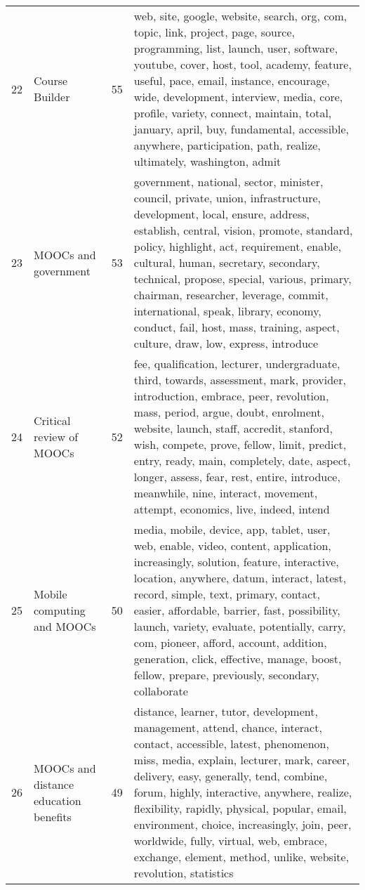 \begin{table}[ht]
{\begin{tabularx}{\textwidth}{llrX}
   22 & Course Builder & 55 & web, site, google, website, search, org, com, topic, link, project, page, source, programming, list, launch, user, software, youtube, cover, host, tool, academy, feature, useful, pace, email, instance, encourage, wide, development, interview, media, core, profile, variety, connect, maintain, total, january, april, buy, fundamental, accessible, anywhere, participation, path, realize, ultimately, washington, admit \\ 
   23 & MOOCs and government & 53 & government, national, sector, minister, council, private, union, infrastructure, development, local, ensure, address, establish, central, vision, promote, standard, policy, highlight, act, requirement, enable, cultural, human, secretary, secondary, technical, propose, special, various, primary, chairman, researcher, leverage, commit, international, speak, library, economy, conduct, fail, host, mass, training, aspect, culture, draw, low, express, introduce \\ 
   24 & Critical review of MOOCs & 52 & fee, qualification, lecturer, undergraduate, third, towards, assessment, mark, provider, introduction, embrace, peer, revolution, mass, period, argue, doubt, enrolment, website, launch, staff, accredit, stanford, wish, compete, prove, fellow, limit, predict, entry, ready, main, completely, date, aspect, longer, assess, fear, rest, entire, introduce, meanwhile, nine, interact, movement, attempt, economics, live, indeed, intend \\ 
   25 & Mobile computing and MOOCs & 50 & media, mobile, device, app, tablet, user, web, enable, video, content, application, increasingly, solution, feature, interactive, location, anywhere, datum, interact, latest, record, simple, text, primary, contact, easier, affordable, barrier, fast, possibility, launch, variety, evaluate, potentially, carry, com, pioneer, afford, account, addition, generation, click, effective, manage, boost, fellow, prepare, previously, secondary, collaborate \\ 
   26 & MOOCs and distance education benefits & 49 & distance, learner, tutor, development, management, attend, chance, interact, contact, accessible, latest, phenomenon, miss, media, explain, lecturer, mark, career, delivery, easy, generally, tend, combine, forum, highly, interactive, anywhere, realize, flexibility, rapidly, physical, popular, email, environment, choice, increasingly, join, peer, worldwide, fully, virtual, web, embrace, exchange, element, method, unlike, website, revolution, statistics \\ 

\end{tabularx}}
\end{table}
